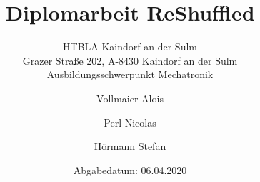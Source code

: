 \documentclass
[
a4paper,															%
12pt,																%
twoside=true,														%
openright,															%
titlepage,															%
headinclude,														%
numbers=noenddot,													%
listof=numbered,													%
bibliography=totocnumbered,											%
]
{scrbook}	                                                        %
\title{Diplomarbeit ReShuffled}
\subtitle{
HTBLA Kaindorf an der Sulm\\
Grazer Straße 202, A-8430 Kaindorf an der Sulm\\
Ausbildungsschwerpunkt Mechatronik}
\author{Vollmaier Alois \and Perl Nicolas \and Hörmann Stefan}
\date{Abgabedatum: 06.04.2020}
\begin{document}
    \onehalfspace
    \maketitle
    
    \tableofcontents
    \mainmatter
    
    
    
    
    
\end{document}

